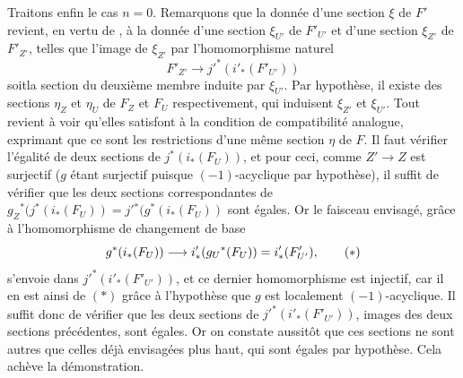 \documentclass[10pt]{../fichiers-configuration-latex/smfart}
\begin{document}
Traitons enfin le cas $n=0$. Remarquons que la donnée d'une section
$\xi$ de $F'$ revient, en vertu de \sisi{\qquad}{\qquad},
à la donnée d'une section $\xi_{U'}$ de $F'_{U'}$ et d'une section $\xi_{Z'}$ de $F'_{Z'}$,
telles que l'image de $\xi_{Z'}$ par l'homomorphisme naturel
$$
F'_{Z'}\longrightarrow {j'}^{\ast}(i'_{\ast}(F'_{U'}))
$$
soit\pageoriginale la section du deuxième membre induite par
$\xi_{U'}$. Par hypothèse, il existe des sections $\eta_Z$ et $\eta_U$
de $F_Z$ et $F_U$ respectivement, qui induisent $\xi_{Z'}$ et
$\xi_{U'}$. Tout revient à voir qu'elles satisfont à la condition de
compatibilité analogue, exprimant que ce sont les restrictions d'une
même section $\eta$ de $F$. Il faut vérifier l'égalité de deux
sections de $j^{\ast}(i_{\ast}(F_U))$, et pour ceci, comme
$Z'\rightarrow Z$ est surjectif ($g$ étant surjectif puisque
$(-1)$-acyclique par hypothèse), il suffit de vérifier que les deux
sections correspondantes de
$g_Z{}^{\ast}(j^{\ast}(i_{\ast}(F_U))=j'{}^{\ast}(g^{\ast}(i_{\ast}(F_U))$
sont égales. Or le faisceau envisagé, grâce à l'homomorphisme de
changement de base
\begin{equation*}
g^{\ast}(i_{\ast}(F_U))\longrightarrow
i'_{\ast}(g_U{}^{\ast}(F_U))=i'_{\ast}(F'_{U'}){},\tag{$\ast$}
\end{equation*}
s'envoie dans ${j'}^{\ast}(i'_{\ast}(F'_{U'}))$, et ce dernier
homomorphisme est injectif, car il en est ainsi de $(\ast)$ grâce à
l'hypothèse que $g$ est localement $(-1)$-acyclique. Il suffit donc de
vérifier que les deux sections de ${j'}^{\ast}(i'_{\ast}(F'_{U'}))$,
images des deux sections précédentes, sont égales. Or on constate
aussitôt que ces sections ne sont autres que celles déjà envisagées
plus haut, qui sont égales par hypothèse. Cela achève la
démonstration.
\end{document}
